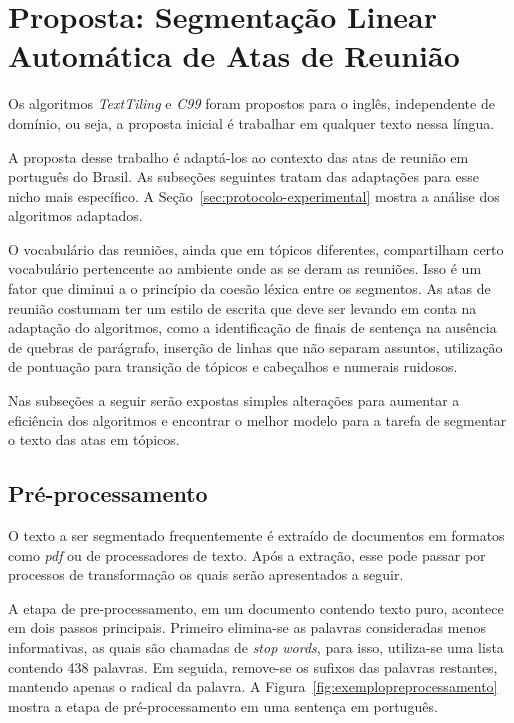 \section{Proposta: Segmentação Linear Automática de Atas de Reunião}
	\label{sec:proposta}



Os algoritmos \textit{TextTiling} e \textit{C99} foram propostos para o inglês, independente de domínio, ou seja, a proposta inicial é trabalhar em qualquer texto nessa língua.

A proposta desse trabalho é adaptá-los ao contexto das atas de reunião em português do Brasil. As subseções seguintes tratam das adaptações para esse nicho mais específico. A Seção~\ref{sec:protocolo-experimental} mostra a análise dos algoritmos adaptados.

O vocabulário das reuniões, ainda que em tópicos diferentes, compartilham certo vocabulário pertencente ao ambiente onde as se deram as reuniões. Isso é um fator que diminui a o princípio da coesão léxica entre os segmentos.
As atas de reunião costumam ter um estilo de escrita que deve ser levando em conta na adaptação do algoritmos, como a identificação de finais de sentença na ausência de quebras de parágrafo, inserção de linhas que não separam assuntos, utilização de pontuação para transição de tópicos e cabeçalhos e numerais ruidosos. 

Nas subseções a seguir serão expostas simples alterações para aumentar a eficiência dos algoritmos e encontrar o melhor modelo para a tarefa de segmentar o texto das atas em tópicos.


\subsection{Pré-processamento}
	\label{subsec:preprocessamento}




	O texto a ser segmentado frequentemente é extraído de documentos em formatos como \textit{pdf} ou de processadores de texto. Após a extração, esse pode passar por processos de transformação os quais serão apresentados a seguir.

	A etapa de pre-processamento, em um documento contendo texto puro, acontece em dois passos principais. Primeiro elimina-se as palavras consideradas menos informativas, as quais são chamadas de \textit{stop words}, para isso, utiliza-se uma lista contendo 438 palavras. Em seguida, remove-se os sufixos das palavras restantes, mantendo apenas o radical da palavra. A Figura~\ref{fig:exemplopreprocessamento} mostra a etapa de pré-processamento em uma sentença em português.
	



